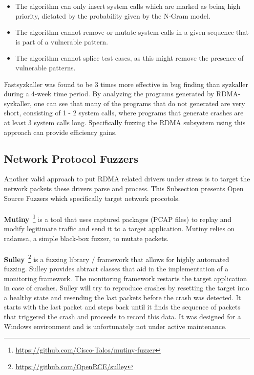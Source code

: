 \begin{itemize}
  \item The algorithm can only insert system calls which are marked as being high priority, dictated by the probability given by the N-Gram model.
  \item The algorithm cannot remove or mutate system calls in a given sequence that is part of a vulnerable pattern.
  \item The algorithm cannot splice test cases, as this might remove the presence of vulnerable patterns.
\end{itemize}

Fastsyzkaller was found to be 3 times more effective in bug finding than syzkaller during a 4-week time period.
By analyzing the programs generated by RDMA-syzkaller, one can see that many of the programs that do not generated are very short, consisting
of 1 - 2 system calls, where programs that generate crashes are at least 3 system calls long. Specifically fuzzing the RDMA subsystem using this
approach can provide efficiency gains.

\subsection{Network Protocol Fuzzers}\label{ss:network-fuzzers}

Another valid approach to put RDMA related drivers under stress is to target the network packets these drivers
parse and process. This Subsection presents Open Source Fuzzers which specifically target network procotols.

\paragraph{}\textbf{Mutiny}~\footnote{\url{https://github.com/Cisco-Talos/mutiny-fuzzer}}
is a tool that uses captured packages (PCAP files)
to replay and modify legitimate traffic and send it to a target
application. Mutiny relies on radamsa, a simple black-box fuzzer, to mutate packets.

\paragraph{}\textbf{Sulley}~\footnote{\url{https://github.com/OpenRCE/sulley}} is a fuzzing library / framework that allows for highly automated fuzzing.
Sulley provides abtract classes that aid in the implementation of a
monitoring framework. The monitoring framework restarts the target
application in case of crashes. Sulley will try to reproduce crashes
by resetting the target into a healthy state and resending the last packets
before the crash was detected. It starts with the last packet and steps
back until it finds the sequence of packets that triggered the crash and
proceeds to record this data. It was designed for a Windows environment and
is unfortunately not under active maintenance.

